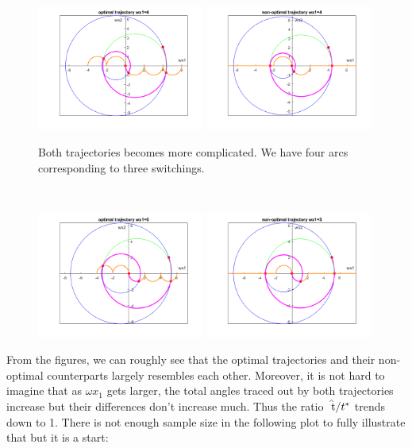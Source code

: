 \documentclass[12pt]{article}
\begin{document}
\begin{problem}[1]
\begin{enumerate}[label=(\alph*)]
~\begin{figure}[H]
	\centering
	\includegraphics[width=0.49\textwidth]{./figures/6.5.png}
	\includegraphics[width=0.49\textwidth]{./figures/6.6.png}
	\caption{Both trajectories becomes more complicated. We have four arcs corresponding to three switchings.}
\end{figure}
~\begin{figure}[H]
	\centering
	\includegraphics[width=0.49\textwidth]{./figures/6.7.png}
	\includegraphics[width=0.49\textwidth]{./figures/6.8.png}
\end{figure}
From the figures, we can roughly see that the optimal trajectories and their non-optimal counterparts largely resembles each other. Moreover, it is not hard to imagine that as $ \omega x_1$ gets larger, the total angles traced out by both trajectories increase but their differences don't increase much. Thus the ratio $ \wh{ t} / t^* $ trends down to 1. There is not enough sample size in the following plot to fully illustrate that but it is a start:

\end{enumerate}
\end{problem}
\end{document}
